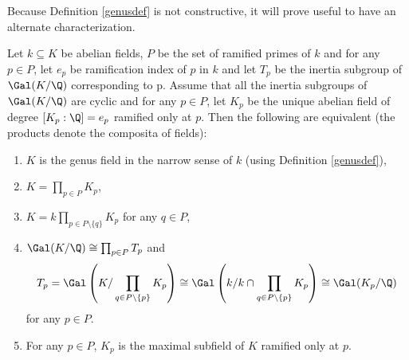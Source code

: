 Because Definition \ref{genusdef} is not constructive, it will prove useful to have an alternate characterization. %
\begin{lemma}\label{genus}
Let $k\subseteq K$ be abelian fields, $P$ be the set of ramified primes of $k$ and for any $p\in P$, let $e_p$ be ramification index of $p$ in $k$ and let $T_p$ be the inertia subgroup of $\Gal(K/\Q)$ corresponding to p. Assume that all the inertia subgroups of $\Gal(K/\Q)$ are cyclic and for any $p\in P$, let $K_p$ be the unique abelian field of degree $[K_p:\Q]=e_p$ ramified only at $p$. Then the following are equivalent (the products denote the composita of fields):
\begin{enumerate}%
\item $K$ is the genus field in the narrow sense of $k$ (using Definition \ref{genusdef}),
\item $K=\prod_{p\in P} K_p$,
\item $K=k\prod_{p\in P\setminus \{q\}} K_p$ for any $q\in P$,
\item $\Gal(K/\Q)\cong \prod_{p\in P} T_p$ and $$T_p=\Gal\left(K/\prod_{q\in P\setminus\{p\}}K_p\right)\cong \Gal\left(k/k\cap\prod_{q\in P\setminus\{p\}}K_p\right)\cong \Gal(K_p/\Q)$$ for any $p\in P$.
\item For any $p\in P$, $K_p$ is the maximal subfield of $K$ ramified only at $p$.
\end{enumerate}
\end{lemma}

